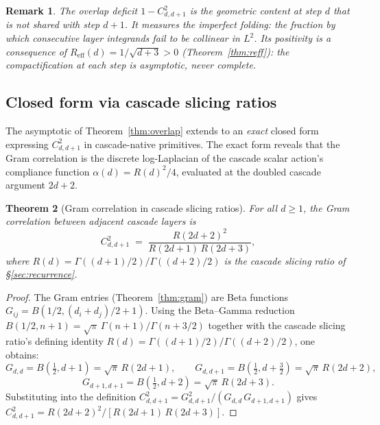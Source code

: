 \documentclass[11pt,a4paper]{article}
\newtheorem{theorem}{Theorem}[section]
\newtheorem{remark}[theorem]{Remark}
\begin{document}
\begin{remark}
The overlap deficit $1 - C_{d,d+1}^2$ is the geometric content at step $d$ that is \emph{not} shared with step $d+1$. It measures the imperfect folding: the fraction by which consecutive layer integrands fail to be collinear in $L^2$. Its positivity is a consequence of $R_{\mathrm{eff}}(d) = 1/\sqrt{d+3} > 0$ (Theorem~\ref{thm:reff}): the compactification at each step is asymptotic, never complete.
\end{remark}

\subsection{Closed form via cascade slicing ratios}\label{sec:gram-closed-form}

The asymptotic of Theorem~\ref{thm:overlap} extends to an \emph{exact} closed form expressing $C^2_{d,d+1}$ in cascade-native primitives. The exact form reveals that the Gram correlation is the discrete log-Laplacian of the cascade scalar action's compliance function $\alpha(d) = R(d)^2/4$, evaluated at the doubled cascade argument $2d+2$.

\begin{theorem}[Gram correlation in cascade slicing ratios]\label{thm:gram-R}
For all $d \geq 1$, the Gram correlation between adjacent cascade layers is
\begin{equation}\label{eq:gram-R-form}
C^2_{d,d+1} \;=\; \frac{R(2d+2)^2}{R(2d+1)\,R(2d+3)},
\end{equation}
where $R(d) = \Gamma((d+1)/2)/\Gamma((d+2)/2)$ is the cascade slicing ratio of \S\ref{sec:recurrence}.
\end{theorem}

\begin{proof}
The Gram entries (Theorem~\ref{thm:gram}) are Beta functions $G_{ij} = B(1/2, (d_i+d_j)/2 + 1)$. Using the Beta--Gamma reduction $B(1/2, n+1) = \sqrt{\pi}\,\Gamma(n+1)/\Gamma(n+3/2)$ together with the cascade slicing ratio's defining identity $R(d) = \Gamma((d+1)/2)/\Gamma((d+2)/2)$, one obtains:
\[
G_{d,d}     = B(\tfrac{1}{2}, d+1)   = \sqrt{\pi}\,R(2d+1), \qquad
G_{d,d+1}   = B(\tfrac{1}{2}, d+\tfrac{3}{2}) = \sqrt{\pi}\,R(2d+2),
\]
\[
G_{d+1,d+1} = B(\tfrac{1}{2}, d+2)   = \sqrt{\pi}\,R(2d+3).
\]
Substituting into the definition $C^2_{d,d+1} = G_{d,d+1}^2 / (G_{d,d}\,G_{d+1,d+1})$ gives
$C^2_{d,d+1} = R(2d+2)^2 / [R(2d+1)\,R(2d+3)]$.
\end{proof}
\end{document}
